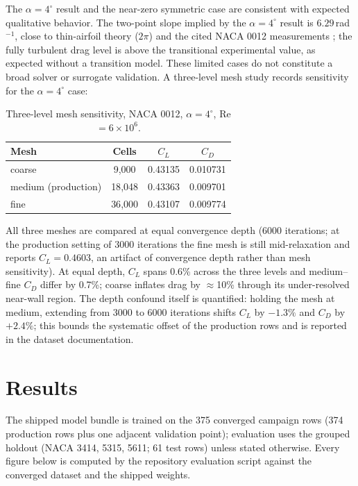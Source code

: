 \documentclass[11pt]{article}
\begin{document}
The $\alpha=4^\circ$ result and the near-zero symmetric case are consistent
with expected qualitative behavior. The two-point slope implied by the
$\alpha=4^\circ$ result is $6.29$\,rad$^{-1}$, close to thin-airfoil theory
($2\pi$) and the cited NACA 0012 measurements \citep{abbott1959, ladson1988};
the fully turbulent drag level is above the transitional experimental value, as
expected without a transition model. These limited cases do not constitute a
broad solver or surrogate validation. A three-level mesh study records
sensitivity for the $\alpha=4^\circ$ case:

\begin{table}[h]
\centering
\caption{Three-level mesh sensitivity, NACA 0012, $\alpha=4^\circ$, Re $=6\times10^6$.}
\label{tab:grid}
\begin{tabular}{lccc}
\toprule
Mesh & Cells & $C_L$ & $C_D$ \\
\midrule
coarse & 9{,}000 & 0.43135 & 0.010731 \\
medium (production) & 18{,}048 & 0.43363 & 0.009701 \\
fine & 36{,}000 & 0.43107 & 0.009774 \\
\bottomrule
\end{tabular}
\end{table}

All three meshes are compared at equal convergence depth (6000 iterations;
at the production setting of 3000 iterations the fine mesh is still
mid-relaxation and reports $C_L=0.4603$, an artifact of convergence depth
rather than mesh sensitivity). At equal depth, $C_L$ spans 0.6\% across the
three levels and medium--fine $C_D$ differ by 0.7\%; coarse inflates drag by
$\approx$10\% through its under-resolved near-wall region. The depth confound
itself is quantified: holding the mesh at medium, extending from 3000 to 6000
iterations shifts $C_L$ by $-1.3\%$ and $C_D$ by $+2.4\%$; this bounds the
systematic offset of the production rows and is reported in the dataset
documentation.

\section{Results}
\label{sec:results}

The shipped model bundle is trained on the 375 converged campaign rows
(374 production rows plus one adjacent validation point); evaluation uses
the grouped holdout (NACA 3414, 5315, 5611; 61 test rows) unless stated
otherwise. Every figure below is computed by the repository evaluation
script against the converged dataset and the shipped weights.
\end{document}
